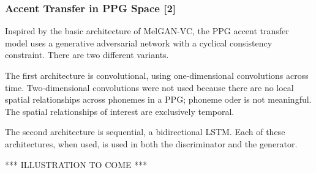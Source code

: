 \subsubsection{Accent Transfer in PPG Space [2]}
%
Inspired by the basic architecture of MelGAN-VC, the PPG accent transfer model uses a 
generative adversarial network with a cyclical consistency constraint. 
There are two different variants.

The first architecture is convolutional, using one-dimensional convolutions across time. 
Two-dimensional convolutions were not used because there are no local spatial relationships 
across phonemes in a PPG; phoneme oder is not meaningful. The spatial relationships of interest are 
exclusively temporal. 

The second architecture is sequential, a bidirectional LSTM. Each of these 
architectures, when used, is used in both the discriminator and the generator.

*** ILLUSTRATION TO COME ***